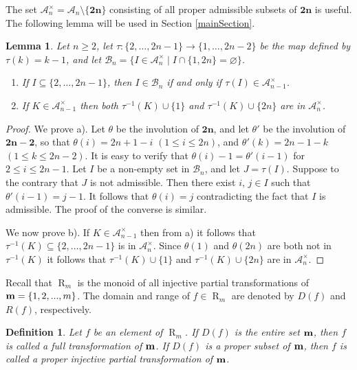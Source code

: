 \documentclass[11pt]{article}
\newtheorem{lemma}[theorem]{Lemma}
\newtheorem{defi}[theorem]{Definition}
\newcommand{\ges}{\geqslant}
\newcommand{\les}{\leqslant}
\newcommand{\mb}{\mathbf}
\DeclareMathOperator{\R}{R}
\begin{document}
 
The set $\mathscr A_n^\times = \mathscr A_n\setminus\{\mb {2n}\}$ consisting of all proper admissible subsets of $\mb {2n}$ is useful. 
The following lemma will be used in Section \ref{mainSection}.
%
\begin{lemma}\label{tau-lemma}
Let $n\ges 2$, let $\tau\colon\{2,\dots, 2n-1\}\to\{1,\dots, 2n-2\}$ be the map defined by $\tau(k)=k-1$, and let $\mathscr B_n=\{I\in\mathscr A_{n}^\times\mid I\cap \{1,2n\}=\varnothing\}$.
\begin{enumerate}[\rm a)]
     \vspace{-2mm}
  \item If $I\subseteq\{2,\dots, 2n-1\}$, then $I\in \mathscr B_{n} $ if and only if $\tau (I)\in \mathscr A_{n-1}^\times$.
           \vspace{-2mm}
  \item If $K\in \mathscr A_{n-1}^\times $ then both $\tau^{-1}(K)\cup\{1\}$ and $\tau^{-1}(K)\cup\{2n\}$ are in $\mathscr A_n^\times$.
\end{enumerate}
\end{lemma}
\begin{proof}
We prove a). Let $\theta$ be the involution of $\mb{2n}$, and let $\theta'$ be the involution of $\mb{2n-2}$, so that 
$\theta(i)=2n+1-i$   $(1\les i\les 2n)$, and $\theta'(k)=2n-1-k$ $(1\les k\les 2n-2)$. It is easy to verify that $\theta(i)-1=\theta'(i-1)$ for $2\les i\les 2n-1$. Let $I$ be a non-empty set in $\mathscr B_n$, and let $J=\tau(I)$.
Suppose to the contrary that $J$ is not admissible. Then there exist $i$, $j\in I$ such that $\theta'(i-1)=j-1$. It follows that
$\theta (i)=j$ contradicting the fact that $I$ is admissible. The proof
of the converse is similar.

We now prove b). If $K\in \mathscr A^\times_{n-1}$ then from a) it follows that $\tau^{-1}(K)\subseteq\{2,\dots, 2n-1\}$ is in $ \mathscr A_{n}^\times$. Since $\theta(1)$ and $\theta(2n)$ are both not in $\tau^{-1}(K)$ it follows that
$\tau^{-1}(K)\cup\{1\}$ and $\tau^{-1}(K)\cup\{2n\}$ are in $\mathscr A_n^\times$.
\end{proof}


%
Recall that $\R_m$ is the monoid of all injective partial transformations of ${\bf m} = \{1, 2, . . . , m\}$. The domain and range of $f\in \R_m$ are denoted by $D(f)$ and $R(f)$, respectively. 
\begin{defi}{\label{properInParTrans}}
Let $f$ be an element of $\R_m$. If $D(f)$ is the entire set $\bf m$, then $f$ is called a full transformation of $\bf m$. If $D(f)$ is a proper subset of $\bf m$, then $f$ is called a proper injective partial transformation of $\bf m$.
\end{defi}
\end{document}
